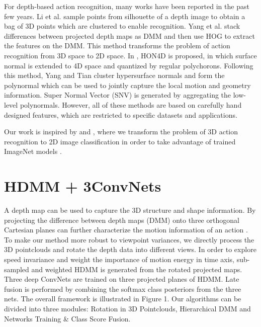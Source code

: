 \documentclass[conference]{IEEEtran}
\begin{document}
For depth-based action recognition, many works have been reported in the past few years. Li et al. \cite{Li2010} sample points from silhouette of a depth image to obtain a bag of 3D points which are clustered to enable recognition. Yang et al. \cite{Yang2012a} stack differences between projected depth maps as DMM and then use HOG to extract the features on the DMM. This method transforms the problem of action recognition from 3D space to 2D space. In \cite{Oreifej2013}, HON4D is proposed, in which surface normal is extended to 4D space and quantized by regular polychorons. Following this method, Yang and Tian \cite{yangsuper} cluster hypersurface normals and form the polynormal which can be used to jointly capture the local motion and geometry information. Super Normal Vector (SNV) is generated by aggregating the low-level polynormals. However, all of these methods are based on carefully hand designed features, which are restricted to specific datasets and applications.  

Our work is inspired by \cite{Yang2012a} and \cite{simonyan2014two}, where we transform the problem of 3D action recognition to 2D image classification in order to take advantage of trained ImageNet models \cite{krizhevsky2012imagenet}. 


\section{HDMM + 3ConvNets}
A depth map can be used to capture the 3D structure and shape information. By projecting the difference between depth maps (DMM) onto three orthogonal Cartesian planes can further characterize the motion information of an action \cite{Yang2012a}. To make our method more robust to viewpoint variances, we directly process the 3D pointclouds and rotate the depth data into different views. In order to explore speed invariance and weight the importance of motion energy in time axis, sub-sampled and weighted HDMM is generated from the rotated projected maps. Three deep ConvNets are trained on three projected planes of HDMM. Late fusion is performed by combining the softmax class posteriors from the three nets. The overall framework is illustrated in Figure 1. Our algorithms can be divided into three modules: Rotation in 3D Pointclouds, Hierarchical DMM and Networks Training \& Class Score Fusion. 
\end{document}
